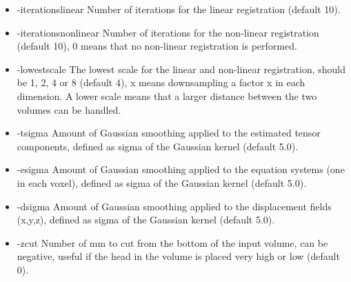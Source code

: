 \begin{itemize}

\item -iterationslinear          
\newline \newline Number of iterations for the linear registration (default 10). 

\newpage

\item -iterationsnonlinear       
\newline \newline Number of iterations for the non-linear registration (default 10), 0 means that no non-linear registration is performed. 

\item -lowestscale               
\newline \newline The lowest scale for the linear and non-linear registration, should be 1, 2, 4 or 8 (default 4), x means downsampling a factor x in each dimension. A lower scale means that a larger distance between the two volumes can be handled.

\item -tsigma                    
\newline \newline Amount of Gaussian smoothing applied to the estimated tensor components, defined as sigma of the Gaussian kernel (default 5.0).  

\item -esigma                    
\newline \newline Amount of Gaussian smoothing applied to the equation systems (one in each voxel), defined as sigma of the Gaussian kernel (default 5.0).  

\item -dsigma                    
\newline \newline Amount of Gaussian smoothing applied to the displacement fields (x,y,z), defined as sigma of the Gaussian kernel (default 5.0).  

\item -zcut                      
\newline \newline Number of mm to cut from the bottom of the input volume, can be negative, useful if the head in the volume is placed very high or low (default 0). 

\end{itemize}

